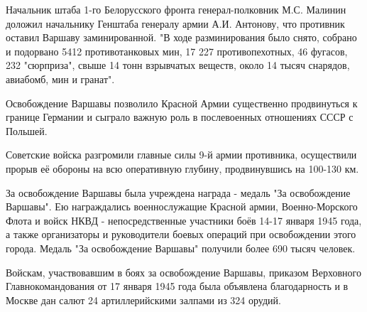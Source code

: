 Начальник штаба 1-го Белорусского фронта генерал-полковник М.С. Малинин доложил
начальнику Генштаба генералу армии А.И. Антонову, что противник оставил Варшаву
заминированной. "В ходе разминирования было снято, собрано и подорвано 5412
противотанковых мин, 17 227 противопехотных, 46 фугасов, 232 "сюрприза", свыше
14 тонн взрывчатых веществ, около 14 тысяч снарядов, авиабомб, мин и гранат". 

Освобождение Варшавы позволило Красной Армии существенно продвинуться к границе
Германии и сыграло важную роль в послевоенных отношениях СССР с Польшей. 

Советские войска разгромили главные силы 9-й армии противника, осуществили
прорыв её обороны на всю оперативную глубину, продвинувшись на 100-130 км. 

За освобождение Варшавы была учреждена награда - медаль "За освобождение
Варшавы". Ею награждались военнослужащие Красной армии, Военно-Морского Флота и
войск НКВД - непосредственные участники боёв 14-17 января 1945 года, а также
организаторы и руководители боевых операций при освобождении этого города.
Медаль "За освобождение Варшавы" получили более 690 тысяч человек. 

Войскам, участвовавшим в боях за освобождение Варшавы, приказом Верховного
Главнокомандования от 17 января 1945 года была объявлена благодарность и в
Москве дан салют 24 артиллерийскими залпами из 324 орудий.
